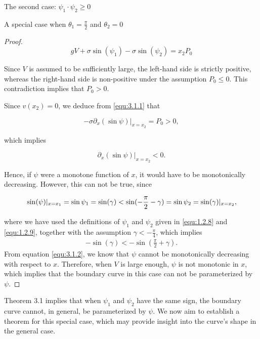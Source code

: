 \documentclass[letterpaper,reqno,10pt,twoside]{amsart}
\theoremstyle{definition}
\theoremstyle{remark}
\begin{document}
\begin{section}{The second case: $\psi_1\cdot \psi_2\geq 0$ }
\begin{subsection}{A special case when $\theta_1=\frac{\pi}{2}$ and $\theta_2=0$}
\begin{proof}
     \begin{equation*}
         gV+\sigma \sin(\psi_1)-\sigma \sin(\psi_2)=x_2P_{0}
     \end{equation*}

     \noindent Since $V$ is assumed to be sufficiently large, the left-hand side is strictly positive, whereas the right-hand side is non-positive under the assumption $P_0\le 0$. This contradiction implies that $P_{0}>0$.
     
     Since $v(x_2)=0$, we deduce from \eqref{equ:3.1.1} that

     \begin{equation*}
         -\sigma \partial_{x}(\sin\psi)|_{x=x_2}=P_{0}> 0,
     \end{equation*}

     \noindent which implies

     \begin{equation*}
         \partial_{x}(\sin\psi)|_{x=x_2}< 0.
     \end{equation*}

     \noindent Hence, if $\psi$ were a monotone function of $x$, it would have to be monotonically decreasing. However, this can not be true, since

     \begin{equation}{\label{equ:3.1.2}}
         \sin(\psi)|_{x=x_{1}}=\sin\psi_1=\sin(\gamma)<\sin(-\frac{\pi}{2}-\gamma)=\sin\psi_2=\sin(\gamma)|_{x=x_2},
     \end{equation}

    \noindent where we have used the definitions of $\psi_1$ and $\psi_2$ given in \eqref{equ:1.2.8} and \eqref{equ:1.2.9}, together with the assumption $\gamma<-\frac{\pi}{4}$, which implies
    \begin{align}
        -\sin(\gamma)<-\sin(\frac{\pi}{2}+\gamma).
    \end{align}
     From equation \eqref{equ:3.1.2}, we know that $\psi$ cannot be monotonically decreasing with respect to $x$. Therefore, when $V$ is large enough, $\psi$ is not monotonic in $x$, which implies that the boundary curve in this case can not be parameterized by $\psi$. 
    \end{proof}

    Theorem 3.1 implies that when $\psi_{1}$ and $\psi_{2}$ have the same sign, the boundary curve cannot, in general, be parameterized by $\psi$.  We now aim to establish a theorem for this special case, which may provide insight into the curve's shape in the general case.
    

\end{subsection}
\end{section}
\end{document}
